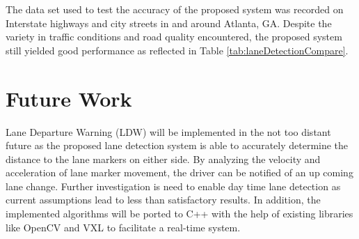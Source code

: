 \documentclass{article}
\begin{document}
The data set used to test the accuracy of the proposed system was recorded on Interstate highways and city streets in and around Atlanta, GA. Despite the variety in traffic conditions and road quality encountered, the proposed system still yielded good performance as reflected in Table \ref{tab:laneDetectionCompare}.

\section{Future Work}
\label{sec:print}
Lane Departure Warning (LDW) will be implemented in the not too distant future as the proposed lane detection system is able to accurately determine the distance to the lane markers on either side. By analyzing the velocity and acceleration of lane marker movement, the driver can be notified of an up coming lane change. Further investigation is need to enable day time lane detection as current assumptions lead to less than satisfactory results. In addition, the implemented algorithms will be ported to C++ with the help of existing libraries like OpenCV and VXL to facilitate a real-time system.

\small


\end{document}
